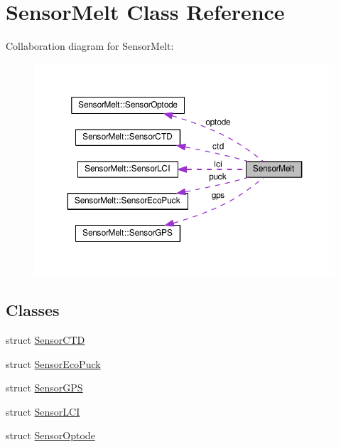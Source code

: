 \hypertarget{classSensorMelt}{}\section{Sensor\+Melt Class Reference}
\label{classSensorMelt}


Collaboration diagram for Sensor\+Melt\+:\nopagebreak
\begin{figure}[H]
\begin{center}
\leavevmode
\includegraphics[width=350pt]{classSensorMelt__coll__graph}
\end{center}
\end{figure}
\subsection*{Classes}
\begin{DoxyCompactItemize}
\item 
struct \hyperlink{structSensorMelt_1_1SensorCTD}{Sensor\+C\+TD}
\item 
struct \hyperlink{structSensorMelt_1_1SensorEcoPuck}{Sensor\+Eco\+Puck}
\item 
struct \hyperlink{structSensorMelt_1_1SensorGPS}{Sensor\+G\+PS}
\item 
struct \hyperlink{structSensorMelt_1_1SensorLCI}{Sensor\+L\+CI}
\item 
struct \hyperlink{structSensorMelt_1_1SensorOptode}{Sensor\+Optode}
\end{DoxyCompactItemize}
